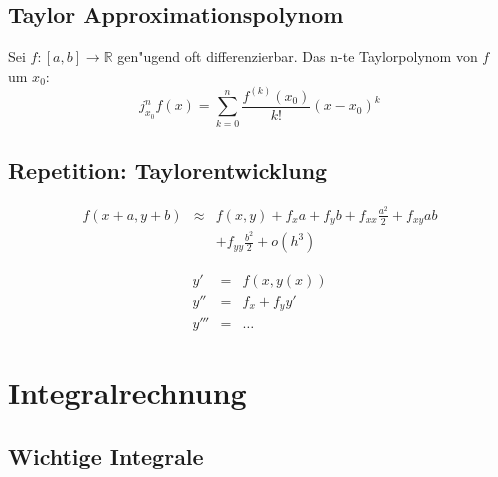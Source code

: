 \documentclass[german, 10pt, a4paper, twocolumn]{scrartcl}
\theoremstyle{definition}
\begin{document}
\subsection{Taylor Approximationspolynom}

Sei $f: [a,b] \to \mathbb{R}$ gen"ugend oft differenzierbar. Das n-te Taylorpolynom von $f$ um $x_0$:
\begin{displaymath}
	j^n_{x_0} f(x) = \sum^n_{k=0}\frac{f^{(k)}(x_0)}{k!}(x-x_0)^k
\end{displaymath}

\subsection{Repetition: Taylorentwicklung}

\begin{eqnarray*}
	f(x + a, y+ b) & \approx & f(x,y) + f_x a + f_y b + f_{xx} \frac{a^2}{2} + f_{xy} a b\\
	&	&	+ f_{yy} \frac{b^2}{2} + o(h^3)
\end{eqnarray*}

\begin{eqnarray*}
	y' &	= &	f(x,y(x))\\
	y'' &	= &	f_x + f_y y'\\
	y'''&	= &	\ldots
\end{eqnarray*}


\section{Integralrechnung}

\subsection{Wichtige Integrale}
\end{document}
